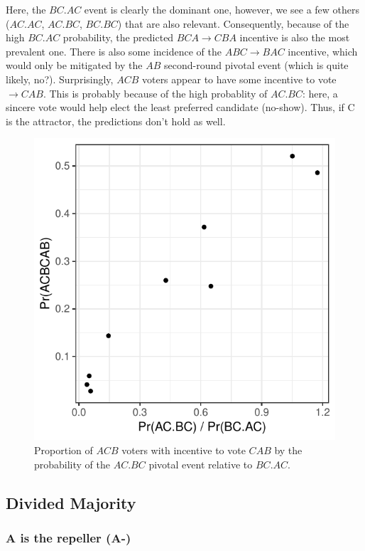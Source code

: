 \documentclass[11pt, letter]{article}
\begin{document}
Here, the $BC.AC$ event is clearly the dominant one, however, we see a few others ($AC.AC$, $AC.BC$, $BC.BC$) that are also relevant. Consequently, because of the high $BC.AC$ probability, the predicted $BCA \rightarrow CBA$ incentive is also the most prevalent one. There is also some incidence of the $ABC \rightarrow BAC$ incentive, which would only be mitigated by the $AB$ second-round pivotal event (which is quite likely, no?). Surprisingly, $ACB$ voters appear to have some incentive to vote $\rightarrow CAB$. This is probably because of the high probablity of $AC.BC$: here, a sincere vote would help elect the least preferred candidate (no-show). Thus, if C is the attractor, the predictions don't hold as well.

\begin{figure}[!htb]
	\centering
	\includegraphics[width = .45\textwidth]{../output/figures/prediction/sp_c_odd.pdf}
	\caption{Proportion of $ACB$ voters with incentive to vote $CAB$ by the probability of the $AC.BC$ pivotal event relative to $BC.AC$.}
	\label{fig:figure1}
\end{figure}

\subsection{Divided Majority}

\subsubsection{A is the repeller (A-)}
\end{document}
